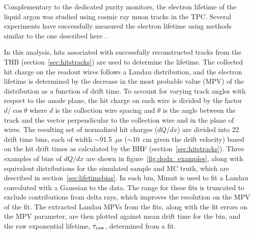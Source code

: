 \documentclass[10pt,a4paper]{article}
\begin{document}
Complementary to the dedicated purity monitors, the electron lifetime of the liquid argon was studied using cosmic ray muon tracks in the TPC. Several experiments have successfully measured the electron lifetime using methods similar to the one described here \cite{lifetimeT600, lifetime120L, lifetimeT600_again,lifetime-argoneut,lifetime-longbo}.

In this analysis, hits associated with successfully reconstructed tracks from the THB (section~\ref{sec:hitstracks}) are used to determine the lifetime. The collected hit charge on the readout wires follows a Landau distribution, and the electron lifetime is determined by the decrease in the most probable value (MPV) of the distribution as a function of drift time. To account for varying track angles with respect to the anode plane, the hit charge on each wire is divided by the factor $d/\cos{\theta}$ where $d$ is the collection wire spacing and $\theta$ is the angle between the track and the vector perpendicular to the collection wire and in the plane of wires. The resulting set of normalized hit charges ($dQ/dx$) are divided into 22 drift time bins, each of width $\sim$91.5~$\mu$s ($\sim$10~cm given the drift velocity) based on the hit drift times as calculated by the BHF (section~\ref{sec:hitstracks}). Three examples of bins of $dQ/dx$ are shown in figure~\ref{fig:dqdx_examples}, along with equivalent distributions for the simulated sample and MC truth, which are described in section~\ref{sec:lifetimebias}. In each bin, Minuit is used to fit a Landau convoluted with a Gaussian to the data. The range for these fits is truncated to exclude contributions from delta rays, which improves the resolution on the MPV of the fit. The extracted Landau MPVs from the fits, along with the fit errors on the MPV parameter, are then plotted against mean drift time for the bin, and the raw exponential lifetime, $\tau_{\rm{raw}}$, determined from a fit. 
\end{document}

